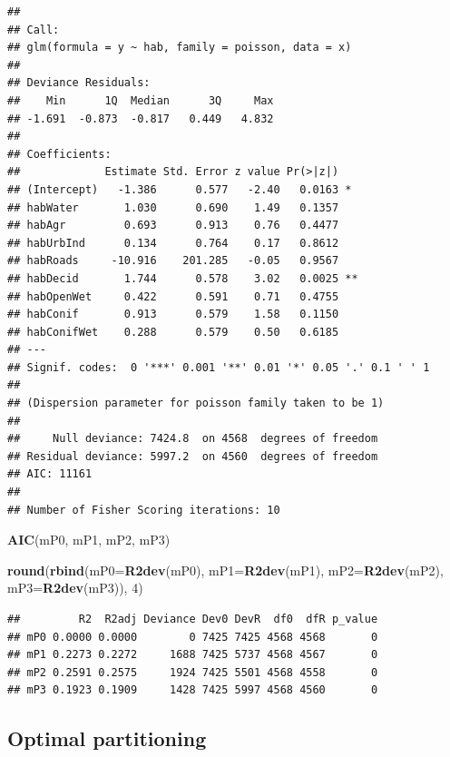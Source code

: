 \documentclass[12pt,]{book}
\newenvironment{Shaded}{\begin{snugshade}}{\end{snugshade}}
\newcommand{\DataTypeTok}[1]{\textcolor[rgb]{0.13,0.29,0.53}{#1}}
\newcommand{\DecValTok}[1]{\textcolor[rgb]{0.00,0.00,0.81}{#1}}
\newcommand{\KeywordTok}[1]{\textcolor[rgb]{0.13,0.29,0.53}{\textbf{#1}}}
\newcommand{\NormalTok}[1]{#1}
\begin{document}
\begin{verbatim}
## 
## Call:
## glm(formula = y ~ hab, family = poisson, data = x)
## 
## Deviance Residuals: 
##    Min      1Q  Median      3Q     Max  
## -1.691  -0.873  -0.817   0.449   4.832  
## 
## Coefficients:
##             Estimate Std. Error z value Pr(>|z|)   
## (Intercept)   -1.386      0.577   -2.40   0.0163 * 
## habWater       1.030      0.690    1.49   0.1357   
## habAgr         0.693      0.913    0.76   0.4477   
## habUrbInd      0.134      0.764    0.17   0.8612   
## habRoads     -10.916    201.285   -0.05   0.9567   
## habDecid       1.744      0.578    3.02   0.0025 **
## habOpenWet     0.422      0.591    0.71   0.4755   
## habConif       0.913      0.579    1.58   0.1150   
## habConifWet    0.288      0.579    0.50   0.6185   
## ---
## Signif. codes:  0 '***' 0.001 '**' 0.01 '*' 0.05 '.' 0.1 ' ' 1
## 
## (Dispersion parameter for poisson family taken to be 1)
## 
##     Null deviance: 7424.8  on 4568  degrees of freedom
## Residual deviance: 5997.2  on 4560  degrees of freedom
## AIC: 11161
## 
## Number of Fisher Scoring iterations: 10
\end{verbatim}

\begin{Shaded}
\begin{Highlighting}[]
\KeywordTok{AIC}\NormalTok{(mP0, mP1, mP2, mP3)}

\KeywordTok{round}\NormalTok{(}\KeywordTok{rbind}\NormalTok{(}\DataTypeTok{mP0=}\KeywordTok{R2dev}\NormalTok{(mP0), }\DataTypeTok{mP1=}\KeywordTok{R2dev}\NormalTok{(mP1), }\DataTypeTok{mP2=}\KeywordTok{R2dev}\NormalTok{(mP2), }\DataTypeTok{mP3=}\KeywordTok{R2dev}\NormalTok{(mP3)), }\DecValTok{4}\NormalTok{)}
\end{Highlighting}
\end{Shaded}

\begin{verbatim}
##         R2  R2adj Deviance Dev0 DevR  df0  dfR p_value
## mP0 0.0000 0.0000        0 7425 7425 4568 4568       0
## mP1 0.2273 0.2272     1688 7425 5737 4568 4567       0
## mP2 0.2591 0.2575     1924 7425 5501 4568 4558       0
## mP3 0.1923 0.1909     1428 7425 5997 4568 4560       0
\end{verbatim}

\hypertarget{optimal-partitioning}{%
\subsection{Optimal partitioning}\label{optimal-partitioning}}
\end{document}
